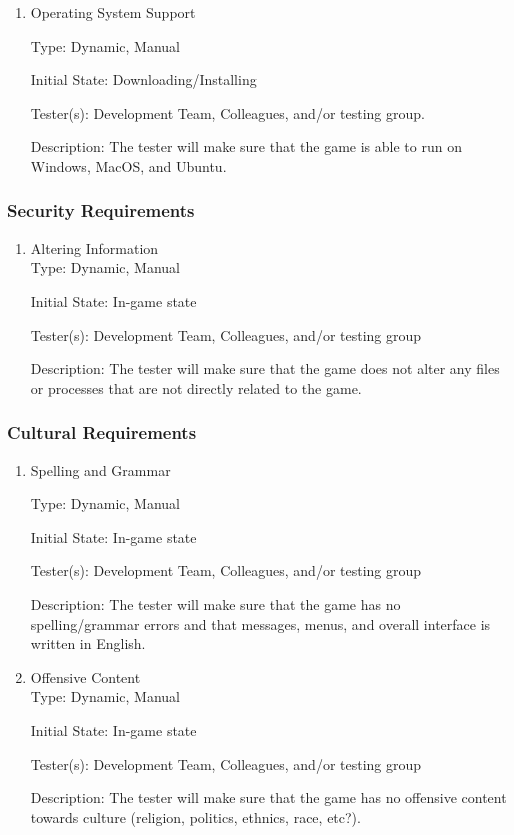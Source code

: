 \documentclass[12pt, titlepage]{article}
\begin{document}
\begin{enumerate}

\item{Operating System Support\\}

Type: Dynamic, Manual

Initial State: Downloading/Installing

Tester(s): Development Team, Colleagues, and/or testing group.

Description: The tester will make sure that the game is able to run on Windows, MacOS, and Ubuntu.

\end{enumerate}

\subsubsection{Security Requirements}

\begin{enumerate}

\item{Altering Information\\}
Type: Dynamic, Manual

Initial State: In-game state

Tester(s): Development Team, Colleagues, and/or testing group

Description: The tester will make sure that the game does not alter any files or processes that are not directly related to the game.

\end{enumerate}


\subsubsection{Cultural Requirements}

\begin{enumerate}

\item{Spelling and Grammar\\}

Type: Dynamic, Manual

Initial State: In-game state

Tester(s): Development Team, Colleagues, and/or testing group

Description: The tester will make sure that the game has no spelling/grammar errors and that messages, menus, and overall interface is written in English.

\item{Offensive Content\\}
Type: Dynamic, Manual

Initial State: In-game state

Tester(s): Development Team, Colleagues, and/or testing group

Description: The tester will make sure that the game has no offensive content towards culture (religion, politics, ethnics, race, etc?).

\end{enumerate}
\end{document}
